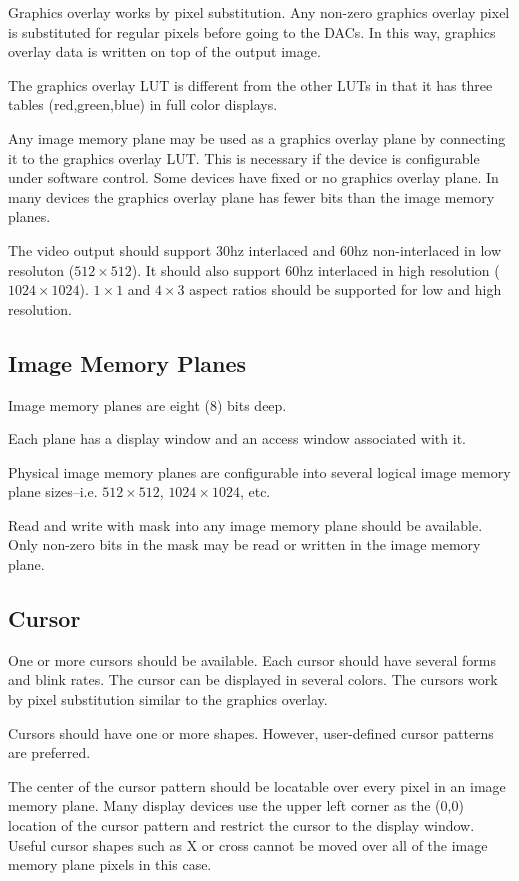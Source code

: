 Graphics overlay works by pixel substitution.  Any non-zero
graphics overlay pixel is substituted for regular pixels before going
to the DACs.  In this way, graphics overlay data is written on top of the
output image.

The graphics overlay LUT is different from the other LUTs in
that it has three tables (red,green,blue) in full color displays.

Any image memory plane may be used as a graphics overlay
plane by connecting it to the graphics overlay LUT.  This is
necessary if the device is configurable under software control.  Some
devices have fixed or no graphics overlay plane.  In many devices the
graphics overlay plane has fewer bits than the image memory planes.

The video output should support 30hz interlaced and 60hz
non-interlaced in low resoluton ($512 \times 512$).  It should also support
60hz interlaced in high resolution ($1024 \times 1024$).  $1 \times 1$
and $4 \times 3$ aspect ratios should be supported for low and
high resolution.
\subsection{Image Memory Planes}
Image memory planes are eight (8) bits deep.

Each plane has a display window and an access window associated
with it.

Physical image memory planes are configurable into several
logical image memory plane sizes--i.e. $512 \times 512$,
$1024 \times 1024$, etc.

Read and write with mask into any image memory plane should
be available.  Only non-zero bits in the mask may be read or written
in the image memory plane.
\subsection{Cursor}
One or more cursors should be available.  Each cursor should
have several forms and blink rates.  The cursor can be displayed in
several colors.  The cursors work by pixel substitution similar to
the graphics overlay.

Cursors should have one or more shapes.  However, user-defined
cursor patterns are preferred.

The center of the cursor pattern should be locatable over every
pixel in an image memory plane.  Many display devices use the upper
left corner as the (0,0) location of the cursor pattern and restrict
the cursor to the display window.  Useful cursor shapes such as X or
cross cannot be moved over all of the image memory plane pixels in
this case.
